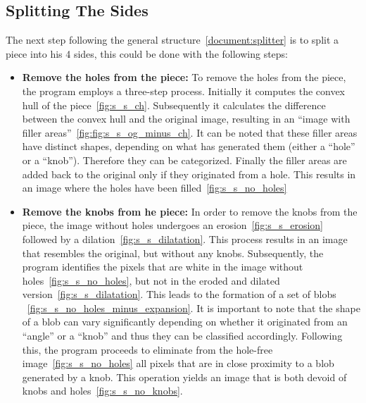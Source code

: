 \documentclass{article}
\begin{document}
\subsection{Splitting The Sides}

The next step following the general structure~\cref{document:splitter}
is to split a piece into
his 4 sides, this could be done with the following steps:

\begin{itemize}

  \item \textbf{Remove the holes from the piece:}\newline
  To remove the holes from the piece, the program employs a three-step process. Initially it
  computes the convex hull of the piece~\cref{fig:s_s_ch}.
  Subsequently it calculates the difference between the convex hull and the original image,
  resulting in an ``image with filler areas''~\cref{fig:fig:s_s_og_minus_ch}.
  It can be noted that these filler areas have distinct shapes,
  depending on what has generated them (either a ``hole'' or a ``knob'').
  Therefore they can be categorized.
  Finally the filler areas are added back to the original only if
  they originated from a hole. This results in an image where the holes
  have been filled~\cref{fig:s_s_no_holes}

  \item \textbf{Remove the knobs from he piece:}\newline
  In order to remove the knobs from the piece, the image without holes
  undergoes an erosion~\cref{fig:s_s_erosion} followed by a dilation~\cref{fig:s_s_dilatation}.
  This process results in an image that resembles the original, but without any knobs.
  Subsequently, the program identifies the pixels that are white in the image without holes~\cref{fig:s_s_no_holes},
  but not in the eroded and dilated version~\cref{fig:s_s_dilatation}.
  This leads to the formation of a set of blobs ~\cref{fig:s_s_no_holes_minus_expansion}.
  It is important to note that the shape of a blob can vary significantly depending on whether it originated
  from an ``angle'' or a ``knob'' and thus they can be classified accordingly.
  Following this, the program proceeds to eliminate from the hole-free
  image~\cref{fig:s_s_no_holes} all pixels that are in close proximity to a blob generated by a knob.
  This operation yields an image that is both devoid of knobs and holes~\cref{fig:s_s_no_knobs}.
  

\end{itemize}
\end{document}
